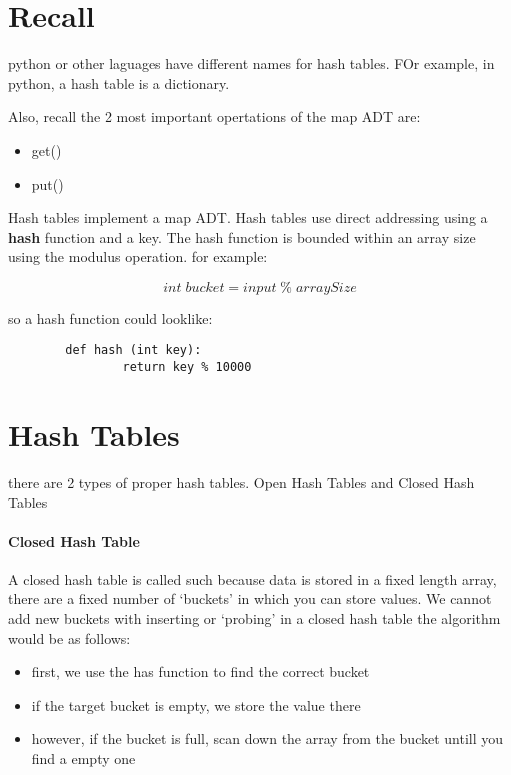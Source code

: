 \documentclass[12pt]{book}
\title{\coursetitle\linebreak\lecturename}
\author{\\Cain Susko\\ 
           \\ \\ \\
      Queen's University 
    \\School of Computing\\}
\begin{document}
\begin{titlepage}
        \maketitle
\end{titlepage}


\section*{Recall}
python or other laguages have  different names for hash tables. FOr example, in python, a hash table is a dictionary.

Also, recall the 2 most important opertations of the map ADT are:
\begin{itemize}
        \item get()
        \item put()
\end{itemize}
Hash tables implement a map ADT.
Hash tables use direct addressing using a \textbf{hash} function and a key.
The hash function is bounded within an array size using the modulus operation. for example:

\[int\;bucket = input\;\%\;arraySize\]

so a hash function could looklike:
\begin{verbatim}
        def hash (int key):
                return key % 10000
\end{verbatim}

\section*{Hash Tables}
there are 2 types of proper hash tables. Open Hash Tables and Closed Hash Tables

\paragraph{Closed Hash Table}
A closed hash table is called such because data is stored in a fixed length array, there are a fixed number of `buckets' in which you can 
store values. We cannot add new buckets
with inserting or `probing' in a closed hash table the algorithm would be as follows:
\begin{itemize}
        \item first, we use the has function to find the correct bucket
        \item if the target bucket is empty, we store the value there
        \item however, if the bucket is full, scan down the array from the bucket untill you find a empty one
\end{itemize}
\end{document}
